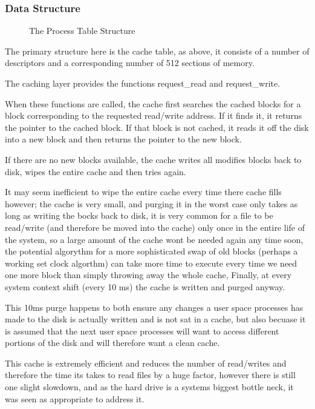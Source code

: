 \documentclass[a4paper]{report}
\begin{document}
\subsubsection{Data Structure}

\begin{figure}[ht]
  \centering

  \def\svgwidth{\columnwidth}
  
  \caption{The Process Table Structure}
  \label{fig:schedulerscreen}
\end{figure}

The primary structure here is the cache table, as above, it consists of a number of descriptors and a corresponding number of 512 sections of memory.

The caching layer provides the functions request_read and request_write.

When these functions are called, the cache first searches the cached blocks for a block corresponding to the requested read/write address. If it finds it, it returns the pointer to the cached block. If that block is not cached, it reads it off the disk into a new block and then returns the pointer to the new block.

If there are no new blocks available, the cache writes all modifies blocks back to disk, wipes the entire cache and then tries again.

It may seem inefficient to wipe the entire cache every time there cache fills however; the cache is very small, and purging it in the worst case only takes as long as writing the bocks back to disk, it is very common for a file to be read/write (and therefore be moved into the cache) only once in the entire life of the system, so a large amount of the cache wont be needed again any time soon, the potential algorythm for a more sophisticated swap of old blocks (perhaps a working set clock algorthm) can take more time to execute every time we need one more block than simply throwing away the whole cache, Finally, at every system context shift (every 10 ms) the cache is written and purged anyway.

This 10ms purge happens to both ensure any changes a user space processes has made to the disk is actually written and is not sat in a cache, but also becuase it is assumed that the next user space processes will want to access different portions of the disk and will therefore want a clean cache.

This cache is extremely efficient and reduces the number of read/writes and therefore the time its takes to read files by a huge factor, however there is still one slight slowdown, and as the hard drive is a systems biggest bottle neck, it was seen as appropriate to address it.
\end{document}
